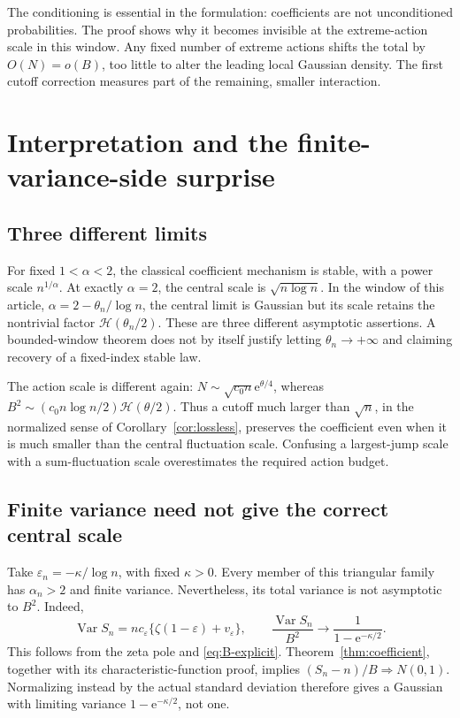\documentclass[11pt,a4paper]{article}
\numberwithin{equation}{section}
\theoremstyle{definition}
\theoremstyle{remark}
\newcommand{\eps}{\varepsilon}
\newcommand{\ee}{\mathrm e}
\newcommand{\hc}{\mathcal H}
\DeclareMathOperator{\Var}{Var}
\begin{document}
The conditioning is essential in the formulation: coefficients are not
unconditioned probabilities. The proof shows why it becomes invisible at
the extreme-action scale in this window. Any fixed number of extreme
actions shifts the total by \(O(N)=o(B)\), too little to alter the leading
local Gaussian density. The first cutoff correction measures part of the
remaining, smaller interaction.

\section{Interpretation and the finite-variance-side surprise}
\label{sec:interpretation}

\subsection{Three different limits}
For fixed \(1<\alpha<2\), the classical coefficient mechanism is stable,
with a power scale \(n^{1/\alpha}\). At exactly \(\alpha=2\), the central
scale is \(\sqrt{n\log n}\). In the window of this article,
\(\alpha=2-\theta_n/\log n\), the central limit is Gaussian but its scale
retains the nontrivial factor \(\hc(\theta_n/2)\). These are three different
asymptotic assertions. A bounded-window theorem does not by itself justify
letting \(\theta_n\to+\infty\) and claiming recovery of a fixed-index
stable law.

The action scale is different again:
\(N\sim\sqrt{c_0n}\ee^{\theta/4}\), whereas
\(B^2\sim(c_0n\log n/2)\hc(\theta/2)\).
Thus a cutoff much larger than \(\sqrt n\), in the normalized sense of
Corollary~\ref{cor:lossless}, preserves the coefficient even when it is much
smaller than the central fluctuation scale. Confusing a largest-jump scale
with a sum-fluctuation scale overestimates the required action budget.

\subsection{Finite variance need not give the correct central scale}
Take \(\eps_n=-\kappa/\log n\), with fixed \(\kappa>0\). Every member of
this triangular family has \(\alpha_n>2\) and finite variance. Nevertheless,
its total variance is not asymptotic to \(B^2\).
Indeed,
\begin{equation}
 \Var S_n=nc_{\eps}\{\zeta(1-\eps)+v_{\eps}\},\qquad
 \frac{\Var S_n}{B^2}\longrightarrow
 \frac1{1-\ee^{-\kappa/2}}.
 \label{eq:variance-mismatch}
\end{equation}
This follows from the zeta pole and \eqref{eq:B-explicit}.
Theorem~\ref{thm:coefficient}, together with its characteristic-function
proof, implies \((S_n-n)/B\Rightarrow N(0,1)\). Normalizing instead by the
actual standard deviation therefore gives a Gaussian with limiting variance
\(1-\ee^{-\kappa/2}\), not one.
\end{document}
